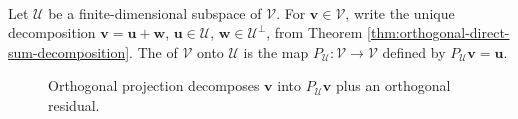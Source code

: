 \begin{definition} \label{def:orthogonal-projection-subspace} \\
Let $\mathcal{U}$ be a finite-dimensional subspace of $\mathcal{V}$. For $\mathbf{v}\in\mathcal{V}$, write the unique decomposition $\mathbf{v}=\mathbf{u}+\mathbf{w}$, $\mathbf{u}\in\mathcal{U}$, $\mathbf{w}\in\mathcal{U}^{\perp}$, from Theorem \ref{thm:orthogonal-direct-sum-decomposition}. The  of $\mathcal{V}$ onto $\mathcal{U}$ is the map $P_{\mathcal{U}}:\mathcal{V}\to\mathcal{V}$ defined by $P_{\mathcal{U}}\mathbf{v}=\mathbf{u}$.
\end{definition}

\begin{figure}[H]
  \centering
  
  \caption{Orthogonal projection decomposes $\mathbf{v}$ into $P_{\mathcal{U}}\mathbf{v}$ plus an orthogonal residual.}
  \label{fig:orthogonal-projection-subspace}
\end{figure}

